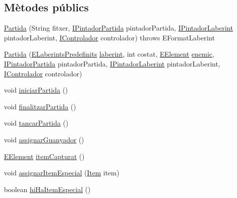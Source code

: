 \subsection*{Mètodes públics}
\begin{DoxyCompactItemize}
\item 
\hyperlink{classlogica_1_1_partida_ab85633f290087fe7699fe41008b2e93a}{Partida} (String fitxer, \hyperlink{interfaceinterficie_1_1_i_pintador_partida}{I\+Pintador\+Partida} pintador\+Partida, \hyperlink{interfaceinterficie_1_1_i_pintador_laberint}{I\+Pintador\+Laberint} pintador\+Laberint, \hyperlink{interfacelogica_1_1controladors__pacman_1_1_i_controlador}{I\+Controlador} controlador)  throws E\+Format\+Laberint
\item 
\hyperlink{classlogica_1_1_partida_a89b9872f1db2660c1c0587d48ccef48c}{Partida} (\hyperlink{enumlogica_1_1enumeracions_1_1_e_laberints_predefinits}{E\+Laberints\+Predefinits} \hyperlink{classlogica_1_1_partida_a12062f14298f0ee05a92aedf4b14e301}{laberint}, int costat, \hyperlink{enumlogica_1_1enumeracions_1_1_e_element}{E\+Element} \hyperlink{classlogica_1_1_partida_ae634faef1c00ccb1658cd1aa4dde990f}{enemic}, \hyperlink{interfaceinterficie_1_1_i_pintador_partida}{I\+Pintador\+Partida} pintador\+Partida, \hyperlink{interfaceinterficie_1_1_i_pintador_laberint}{I\+Pintador\+Laberint} pintador\+Laberint, \hyperlink{interfacelogica_1_1controladors__pacman_1_1_i_controlador}{I\+Controlador} controlador)
\item 
void \hyperlink{classlogica_1_1_partida_aa23f62dbeea7c44240304843e2ea699d}{iniciar\+Partida} ()
\item 
void \hyperlink{classlogica_1_1_partida_a44c3c25575052f971e90728f15f9c5a2}{finalitzar\+Partida} ()
\item 
void \hyperlink{classlogica_1_1_partida_add05723aee1bf8587d0021f96f372c51}{tancar\+Partida} ()
\item 
void \hyperlink{classlogica_1_1_partida_a29bd0292c22c67f4ada328373ec00d05}{assignar\+Guanyador} ()
\item 
\hyperlink{enumlogica_1_1enumeracions_1_1_e_element}{E\+Element} \hyperlink{classlogica_1_1_partida_a4f899f5e8cd1e5acc95321331aace206}{item\+Capturat} ()
\item 
void \hyperlink{classlogica_1_1_partida_a0e5b8e4beaaf3a3e425e63a3dfe2fc7a}{assignar\+Item\+Especial} (\hyperlink{classlogica_1_1_item}{Item} item)
\item 
boolean \hyperlink{classlogica_1_1_partida_acacc85c1923ed99015b4311557843d2f}{hi\+Ha\+Item\+Especial} ()
\item 

\end{DoxyCompactItemize}
